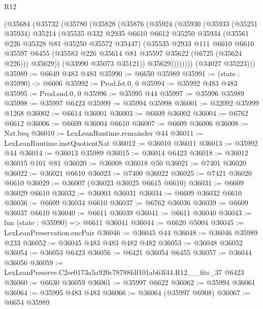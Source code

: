 \begin{lexlean}{R12}
\begin{coremodule}
          (@35684
            (@35732
              (@35780
                (@35828
                  (@35876
                    (@35924
                      (@35930
                        (@35933
                          (@35251 @35934)
                          @35214
                          (@35535
                            @332
                            @2935
                            @6610
                            @6612
                            @35250
                            @35934
                            (@35561 @226 @35328 @81 @35250 @35572 @35447)
                            (@35535
                              @2933
                              @111
                              @6610
                              @6610
                              @35597
                              @6455
                              (@35583 @226 @35614 @81 @35597 @35622 (@6725 (@35624 @226)))
                              @35629))
                          (@33990 @35073 @35121))
                        @35629))))))))
        (@34027 @35223)))
@35989 := @6649 @483 @483
@35990 := @6650 @35989
@35991 := (state : @35990) -> @6606
@35992 := Prod.fst.{0, 0}
@35994 := @35992 @483 @483
@35995 := Prod.snd.{0, 0}
@35996 := @35995 @44
@35997 := @35996 @35989
@35998 := @35997 @6423
@35999 := @35994 @35998
@36001 := @32092 @35999 @1268
@36002 := @6614 @36001
@36003 := @6609 @36002
@36004 := @6762 @6612
@36006 := @6609 @36004 @6610
@36007 := @6609 @36006
@36008 := Nat.beq
@36010 := LexLeanRuntime.remainder @44
@36011 := LexLeanRuntime.instQuotientNat
@36012 := @36010 @36011
@36013 := @35992 @44
@36014 := @36013 @35989
@36015 := @36014 @6423
@36018 := @36012 @36015 @101 @81
@36020 := @36008 @36018 @50
@36021 := @7401 @36020
@36022 := @36021 @6610
@36023 := @7400 @36022
@36025 := @7421 @36020 @6610
@36029 := @36007 (@36023 @36025 @6615 @6610)
@36031 := @6609 @36029 @6610
@36032 := @36003 @36031
@36034 := @6609 @36032 @6610
@36036 := @6609 @36034 @6610
@36037 := @6762 @36036
@36039 := @6609 @36037 @6610
@36040 := @6611 @36039
@36041 := @6611 @36040
@36043 := fun (state : @35990) => @6611 @36041
@36044 := @6620 @5004
@36045 := LexLeanPreservation.encPair
@36046 := @36045 @44
@36048 := @36046 @35989 @233
@36052 := @36045 @483 @483 @482 @482
@36053 := @36048 @36052
@36054 := @36053 @6423
@36056 := @6421 @36054 @6455
@36057 := @36044 @36056
@36059 := LexLeanPreserve.C2ee0173a5a920c78788fdf101ab63f44.R12.__fits_37 @6423
@36060 := @6630 @36059
@36061 := @35997 @6622
@36062 := @35994 @36061
@36064 := @35995 @483 @483
@36066 := @36064 (@35997 @6908)
@36067 := @6654 @35989

\end{coremodule}
\end{lexlean}
